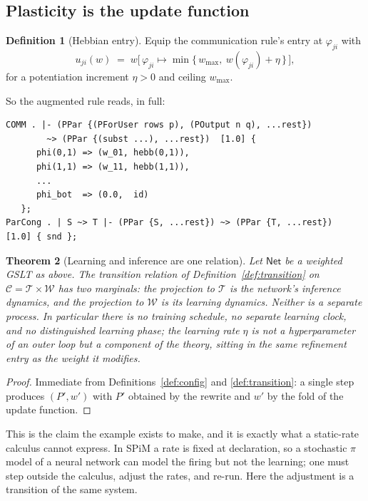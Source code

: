 \documentclass[11pt,a4paper]{article}
\theoremstyle{plain}
\newtheorem{theorem}{Theorem}
\theoremstyle{definition}
\newtheorem{definition}[theorem]{Definition}
\theoremstyle{remark}
\newcommand{\Terms}{\mathcal{T}}
\newcommand{\Cfg}{\mathcal{C}}
\newcommand{\Wt}{\mathcal{W}}
\newcommand{\wmap}{w}
\begin{document}
\subsection{Plasticity is the update function}
\label{sec:plasticity}

\begin{definition}[Hebbian entry]
\label{def:hebb}
Equip the communication rule's entry at $\varphi_{ji}$ with
\[
u_{ji}(\wmap) \;=\; \wmap\big[\,\varphi_{ji} \mapsto \min\{\,w_{\max},\ \wmap(\varphi_{ji}) + \eta\,\}\,\big],
\]
for a potentiation increment $\eta > 0$ and ceiling $w_{\max}$.
\end{definition}

So the augmented rule reads, in full:
\begin{center}
\begin{minipage}{0.92\textwidth}
\begin{lstlisting}
COMM . |- (PPar {(PForUser rows p), (POutput n q), ...rest})
        ~> (PPar {(subst ...), ...rest})  [1.0] {
      phi(0,1) => (w_01, hebb(0,1)),
      phi(1,1) => (w_11, hebb(1,1)),
      ...
      phi_bot  => (0.0,  id)
   };
ParCong . | S ~> T |- (PPar {S, ...rest}) ~> (PPar {T, ...rest})  [1.0] { snd };
\end{lstlisting}
\end{minipage}
\end{center}

\begin{theorem}[Learning and inference are one relation]
\label{thm:one-relation}
Let $\mathsf{Net}$ be a weighted GSLT as above. The transition relation of
Definition~\ref{def:transition} on $\Cfg = \Terms \times \Wt$ has two marginals: the projection to
$\Terms$ is the network's inference dynamics, and the projection to $\Wt$ is its learning dynamics.
Neither is a separate process. In particular there is no training schedule, no separate learning
clock, and no distinguished learning phase; the learning rate $\eta$ is not a hyperparameter of an
outer loop but a component of the theory, sitting in the same refinement entry as the weight it
modifies.
\end{theorem}

\begin{proof}
Immediate from Definitions~\ref{def:config} and \ref{def:transition}: a single step produces
$(P', \wmap')$ with $P'$ obtained by the rewrite and $\wmap'$ by the fold of the update function.
\end{proof}

This is the claim the example exists to make, and it is exactly what a static-rate calculus cannot
express. In SPiM a rate is fixed at declaration, so a stochastic $\pi$ model of a neural network can
model the firing but not the learning; one must step outside the calculus, adjust the rates, and
re-run. Here the adjustment is a transition of the same system.
\end{document}
